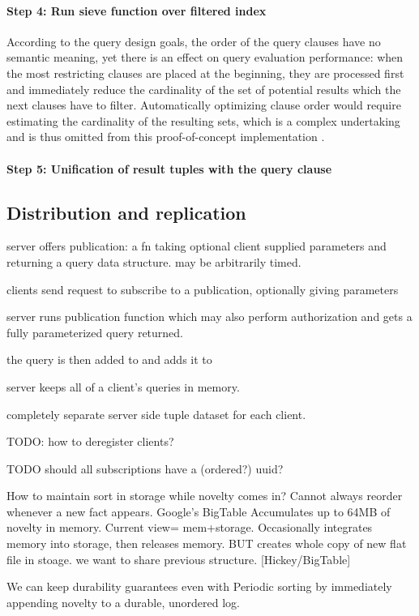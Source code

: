 \paragraph{Step 4: Run sieve function over filtered index}

According to the query design goals, the order of the query clauses have no semantic meaning, yet there is an effect on query evaluation performance: when the most restricting clauses are placed at the beginning, they are processed first and immediately reduce the cardinality of the set of potential results which the next clauses have to filter. Automatically optimizing clause order would require estimating the cardinality of the resulting sets, which is a complex undertaking and is thus omitted from this proof-of-concept implementation \cite{neumann2011characteristic, malik2007black}.



\paragraph{Step 5: Unification of result tuples with the query clause}



\subsection{Distribution and replication}

server offers publication: a fn taking optional client supplied parameters and returning a query data structure. may be arbitrarily timed.

clients send request to subscribe to a publication, optionally giving parameters

server runs publication function which may also perform authorization and gets a fully parameterized query returned.

the query is then added to and adds it to

server keeps all of a client's queries in memory.

completely separate server side tuple dataset for each client.

TODO: how to deregister clients?

TODO should all subscriptions have a (ordered?) uuid?

How to maintain sort in storage while novelty comes in? Cannot always reorder whenever a new fact appears. Google's BigTable Accumulates up to 64MB of novelty in memory. Current view= mem+storage. Occasionally integrates memory into storage, then releases memory. BUT creates whole copy of new flat file in stoage. we want to share previous structure. [Hickey/BigTable]

We can keep durability guarantees even with Periodic sorting by immediately appending novelty to a durable, unordered log.
